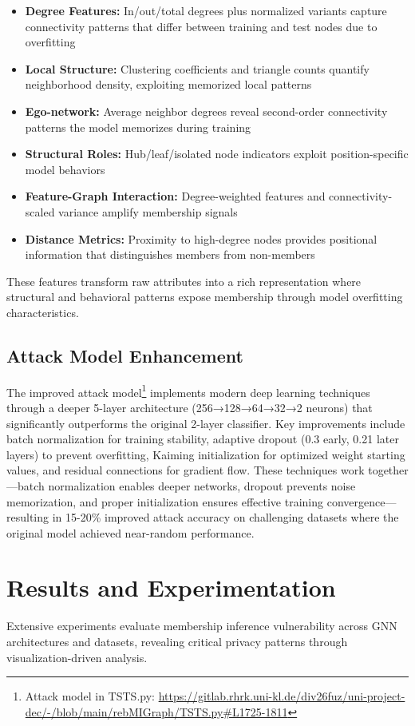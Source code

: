 \documentclass{article}
\begin{document}
\begin{itemize}
\item \textbf{Degree Features:} In/out/total degrees plus normalized variants capture connectivity patterns that differ between training and test nodes due to overfitting
\item \textbf{Local Structure:} Clustering coefficients and triangle counts quantify neighborhood density, exploiting memorized local patterns
\item \textbf{Ego-network:} Average neighbor degrees reveal second-order connectivity patterns the model memorizes during training
\item \textbf{Structural Roles:} Hub/leaf/isolated node indicators exploit position-specific model behaviors
\item \textbf{Feature-Graph Interaction:} Degree-weighted features and connectivity-scaled variance amplify membership signals
\item \textbf{Distance Metrics:} Proximity to high-degree nodes provides positional information that distinguishes members from non-members
\end{itemize}

These features transform raw attributes into a rich representation where structural and behavioral patterns expose membership through model overfitting characteristics.

\subsection{Attack Model Enhancement}
The improved attack model\footnote{Attack model in TSTS.py: \url{https://gitlab.rhrk.uni-kl.de/div26fuz/uni-project-dec/-/blob/main/rebMIGraph/TSTS.py\#L1725-1811}} implements modern deep learning techniques \cite{he2015delving} through a deeper 5-layer architecture (256→128→64→32→2 neurons) that significantly outperforms the original 2-layer classifier. Key improvements include batch normalization for training stability, adaptive dropout (0.3 early, 0.21 later layers) to prevent overfitting, Kaiming initialization for optimized weight starting values, and residual connections for gradient flow. These techniques work together—batch normalization enables deeper networks, dropout prevents noise memorization, and proper initialization ensures effective training convergence—resulting in 15-20\% improved attack accuracy on challenging datasets where the original model achieved near-random performance.

\section{Results and Experimentation}
\label{results}
Extensive experiments evaluate membership inference vulnerability across GNN architectures and datasets, revealing critical privacy patterns through visualization-driven analysis.
\end{document}
